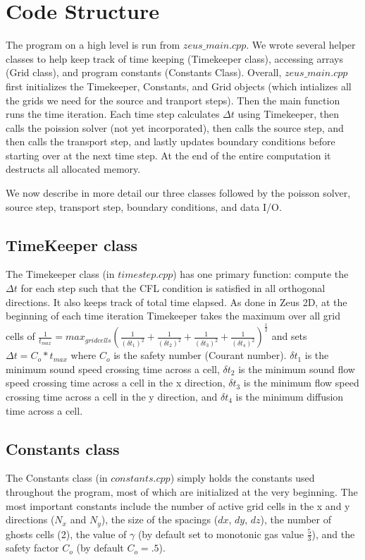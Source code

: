 \documentclass[11pt]{article}
\begin{document}
\section{Code Structure}
The program on a high level is run from $zeus\_main.cpp$. We wrote several helper classes to help keep track of time keeping (Timekeeper class), accessing arrays (Grid class), and program constants (Constants Class). Overall, $zeus\_main.cpp$ first initializes the Timekeeper, Constants, and Grid objects (which intializes all the grids we need for the source and tranport steps). Then the main function runs the time iteration. Each time step calculates $\Delta t$ using Timekeeper, then calls the poission solver (not yet incorporated), then calls the source step, and then calls the transport step, and lastly updates boundary conditions before starting over at the next time step. At the end of the entire computation it destructs all allocated memory. 

We now describe in more detail our three classes followed by the poisson solver, source step, transport step, boundary conditions, and data I/O.
\subsection{TimeKeeper class}
The Timekeeper class (in $timestep.cpp$) has one primary function: compute the $\Delta t$ for each step such that the CFL condition is satisfied in all orthogonal directions. It also keeps track of total time elapsed. As done in Zeus 2D, at the beginning of each time iteration Timekeeper takes the maximum over all grid cells of $\frac{1}{t_{max}}=max_{grid cells}(\frac{1}{(\delta t_1)^2}+\frac{1}{(\delta t_2)^2}+\frac{1}{(\delta t_3)^2}+\frac{1}{(\delta t_4)^2})^{\frac{1}{2}}$ and sets $\Delta t=C_o *t_{max}$ where $C_o$ is the safety number (Courant number). $\delta t_1$ is the minimum sound speed crossing time across a cell, $\delta t_2$ is the minimum sound flow speed crossing time across a cell in the x direction, $\delta t_3$ is the minimum flow speed crossing time across a cell in the y direction, and $\delta t_4$ is the minimum diffusion time across a cell. 
\subsection{Constants class}
The Constants class (in $constants.cpp$) simply holds the constants used throughout the program, most of which are initialized at the very beginning. The most important constants include the number of active grid cells in the x and y directions ($N_x$ and $N_y$), the size of the spacings ($dx$, $dy$, $dz$), the number of ghosts cells (2), the value of $\gamma$ (by default set to monotonic gas value $\frac{5}{3}$), and the safety factor $C_o$ (by default $C_o=.5$).
\end{document}
